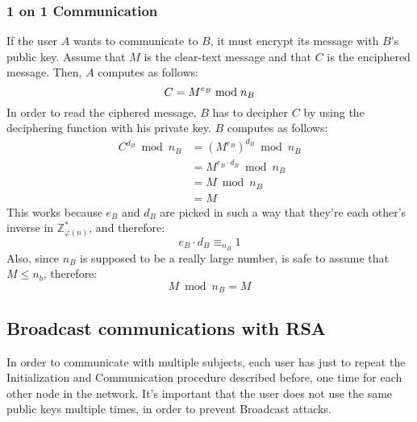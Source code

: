 \subsubsection{1 on 1 Communication}
If the user $A$ wants to communicate to $B$, it must encrypt its message with $B$'s public key. Assume that $M$ is the clear-text message and that $C$ is the enciphered message. Then, $A$ computes as follows:
\[
    C = M^{e_{B}} \bmod n_{B} \\
\]
In order to read the ciphered message, $B$ has to decipher $C$ by using the deciphering function with his private key. $B$ computes as follows:
\begin{align*}
    C^{d_{B}} \bmod n_{B} &= (M^{e_{B}})^{d_{B}} \bmod n_{B} \\
    &= M^{e_{B} \cdot d_{B}} \bmod n_{B} \\
    &= M \bmod n_{B} \\
    &= M
\end{align*}
This works because $e_{B}$ and $d_{B}$ are picked in such a way that they're each other's inverse in $\mathbb{Z}_{\varphi(n)}^{*}$, and therefore:
\[
    e_{B} \cdot d_{B} \equiv_{n_{B}} 1
\]
Also, since $n_{B}$ is supposed to be a really large number, is safe to assume that $M \leq n_{b}$, therefore:
\[
M \bmod n_{B} = M
\] 

\subsection{Broadcast communications with RSA}
In order to communicate with multiple subjects, each user has just to repeat the Initialization and Communication procedure described before, one time for each other node in the network. \newline
It's important that the user does not use the same public keys multiple times, in order to prevent Broadcast attacks.
